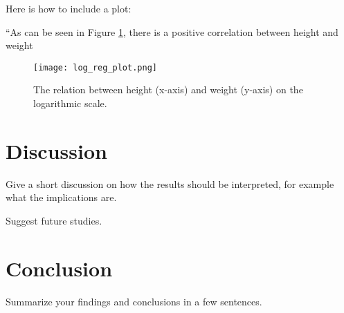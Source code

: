 \documentclass[a4paper,12pt]{article}
\begin{document}
Here is how to include a plot:

``As can be seen in Figure \ref{fig:heightWeight}, there is a positive correlation between height and weight

\begin{figure}[h!]
    \centering
    \texttt{[image: log\_reg\_plot.png]}
    \caption{The relation between height (x-axis) and weight (y-axis) on the logarithmic scale.}
    \label{fig:heightWeight}
\end{figure}


\section{Discussion}
Give a short discussion on how the results should be interpreted, for example what the implications are.

Suggest future studies.

\section{Conclusion}
Summarize your findings and conclusions in a few sentences.

\newpage



\end{document}
